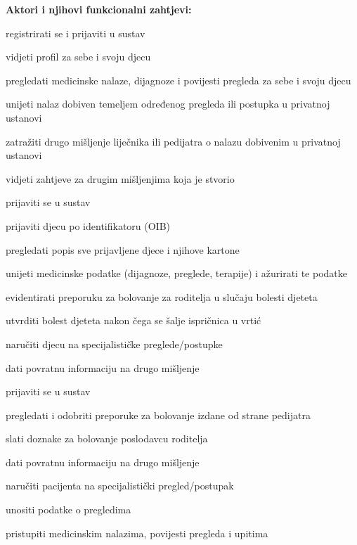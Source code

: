 			\noindent \textbf{Aktori i njihovi funkcionalni zahtjevi:}
			\begin{packed_enum}
				\item  {}
				\begin{packed_enum}
					\item registrirati se i prijaviti u sustav
                    \item vidjeti profil za sebe i svoju djecu
					\item pregledati medicinske nalaze, dijagnoze i povijesti pregleda za sebe i svoju djecu
					\item unijeti nalaz dobiven temeljem određenog pregleda ili postupka u privatnoj ustanovi
                    \item zatražiti drugo mišljenje liječnika ili pedijatra o nalazu dobivenim u privatnoj ustanovi
                    \item vidjeti zahtjeve za drugim mišljenjima koja je stvorio
				\end{packed_enum}
			
				\item  {}
				\begin{packed_enum}
					\item prijaviti se u sustav
                    \item prijaviti djecu po identifikatoru (OIB)
                    \item pregledati popis sve prijavljene djece i njihove kartone
					\item unijeti medicinske podatke (dijagnoze, preglede, terapije) i ažurirati te podatke
                    \item evidentirati preporuku za bolovanje za roditelja u slučaju bolesti djeteta
                    \item utvrditi bolest djeteta nakon čega se šalje ispričnica u vrtić
                    \item naručiti djecu na specijalističke preglede/postupke
                    \item dati povratnu informaciju na drugo mišljenje
				\end{packed_enum}

                \item  {}
				\begin{packed_enum}
					\item prijaviti se u sustav
                    \item pregledati i odobriti preporuke za bolovanje izdane od strane pedijatra 
					\item slati doznake za bolovanje poslodavcu roditelja
                    \item dati povratnu informaciju na drugo mišljenje
                    \item naručiti pacijenta na specijalistički pregled/postupak
                    \item unositi podatke o pregledima
                    \item pristupiti medicinskim nalazima, povijesti pregleda i upitima 
				\end{packed_enum}
    

\end{packed_enum}
